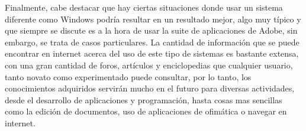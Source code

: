 \documentclass{article}
\begin{document}
Finalmente, cabe destacar que hay ciertas situaciones donde usar un sistema diferente como
Windows podría resultar en un resultado mejor, algo muy típico y que siempre se discute es a
la hora de usar la suite de aplicaciones de Adobe, sin embargo, se trata de casos particulares.
La cantidad de información que se puede encontrar en internet acerca del uso de este tipo de
sistemas es bastante extensa, con una gran cantidad de foros, artículos y enciclopedias que
cualquier usuario, tanto novato como experimentado puede consultar, por lo tanto, los
conocimientos adquiridos servirán mucho en el futuro para diversas actividades, desde el
desarrollo de aplicaciones y programación, hasta cosas mas sencillas como la edición de
documentos, uso de aplicaciones de ofimática o navegar en internet.
\end{document}

